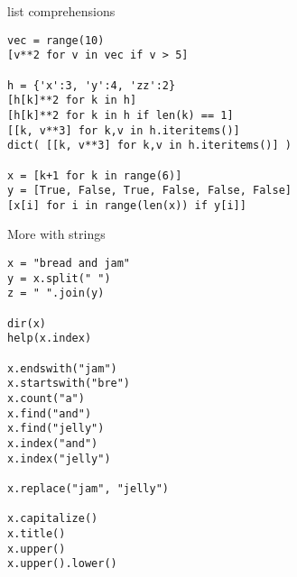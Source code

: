 \documentclass[12pt,t]{beamer}
\begin{document}
\begin{frame}[fragile]{list comprehensions}

\begin{lstlisting}
vec = range(10)
[v**2 for v in vec if v > 5]

h = {'x':3, 'y':4, 'zz':2}
[h[k]**2 for k in h]
[h[k]**2 for k in h if len(k) == 1]
[[k, v**3] for k,v in h.iteritems()]
dict( [[k, v**3] for k,v in h.iteritems()] )

x = [k+1 for k in range(6)]
y = [True, False, True, False, False, False]
[x[i] for i in range(len(x)) if y[i]]
\end{lstlisting}

\end{frame}


\begin{frame}[c,fragile]{More with strings}

\begin{lstlisting}
x = "bread and jam"
y = x.split(" ")
z = " ".join(y)

dir(x)
help(x.index)

x.endswith("jam")
x.startswith("bre")
x.count("a")
x.find("and")
x.find("jelly")
x.index("and")
x.index("jelly")

x.replace("jam", "jelly")

x.capitalize()
x.title()
x.upper()
x.upper().lower()
\end{lstlisting}

\end{frame}
\end{document}
